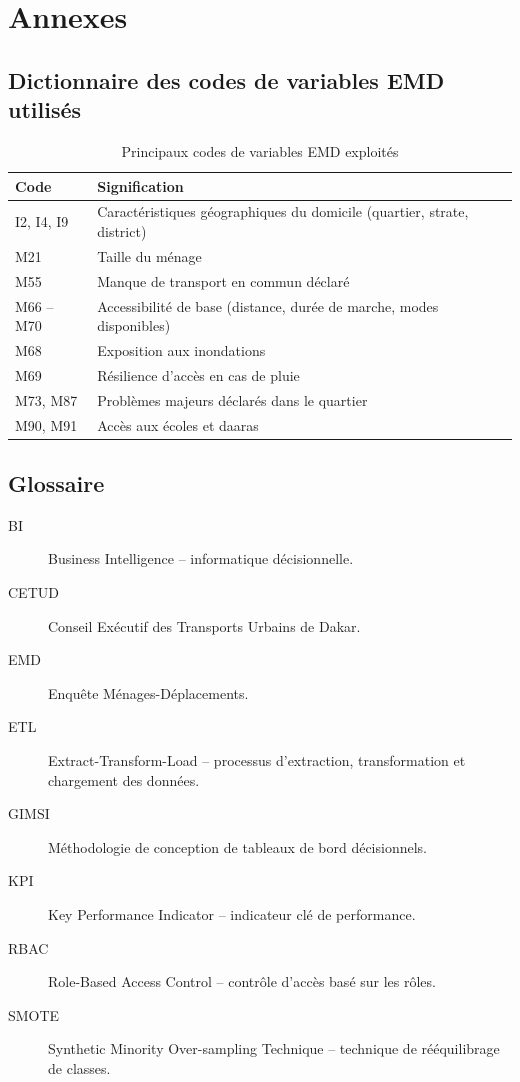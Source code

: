 \chapter{Annexes}

\section{Dictionnaire des codes de variables EMD utilisés}
\begin{table}[H]
\centering
\caption{Principaux codes de variables EMD exploités}
\begin{tabular}{ll}
\toprule
\textbf{Code} & \textbf{Signification} \\
\midrule
I2, I4, I9 & Caractéristiques géographiques du domicile (quartier, strate, district) \\
M21 & Taille du ménage \\
M55 & Manque de transport en commun déclaré \\
M66 -- M70 & Accessibilité de base (distance, durée de marche, modes disponibles) \\
M68 & Exposition aux inondations \\
M69 & Résilience d'accès en cas de pluie \\
M73, M87 & Problèmes majeurs déclarés dans le quartier \\
M90, M91 & Accès aux écoles et daaras \\
\bottomrule
\end{tabular}
\end{table}

\section{Glossaire}
\begin{description}
\item[BI] Business Intelligence -- informatique décisionnelle.
\item[CETUD] Conseil Exécutif des Transports Urbains de Dakar.
\item[EMD] Enquête Ménages-Déplacements.
\item[ETL] Extract-Transform-Load -- processus d'extraction, transformation et chargement des données.
\item[GIMSI] Méthodologie de conception de tableaux de bord décisionnels.
\item[KPI] Key Performance Indicator -- indicateur clé de performance.
\item[RBAC] Role-Based Access Control -- contrôle d'accès basé sur les rôles.
\item[SMOTE] Synthetic Minority Over-sampling Technique -- technique de rééquilibrage de classes.
\end{description}

